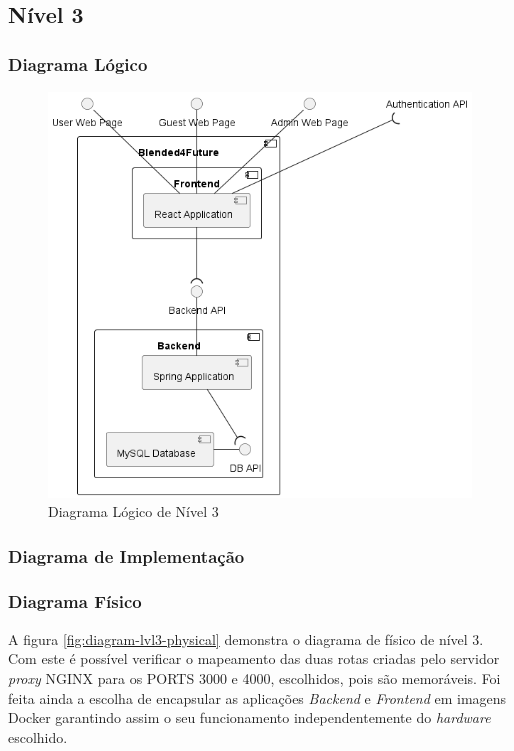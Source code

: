 \subsection{Nível 3}

\subsubsection{Diagrama Lógico}

\begin{figure}[h!tbp]
    \centering
    \includegraphics[width=0.8\linewidth]{capitulos/cap3-analisedoproblema/assets/arquiteturasistema/logical/logical_l3.png}
    \caption{Diagrama Lógico de Nível 3}
    \label{fig:diagram-lvl3-logical}
\end{figure}


\subsubsection{Diagrama de Implementação}

\subsubsection{Diagrama Físico} 
A figura \ref{fig:diagram-lvl3-physical} demonstra o diagrama de físico de nível 3. Com este é possível verificar o mapeamento das duas rotas criadas pelo servidor \textit{proxy} \gls{NGINX} para os PORTS 3000 e 4000, escolhidos, pois são memoráveis. Foi feita ainda a escolha de encapsular as aplicações \textit{Backend} e \textit{Frontend} em imagens \gls{Docker} garantindo assim o seu funcionamento independentemente do \textit{hardware} escolhido.

